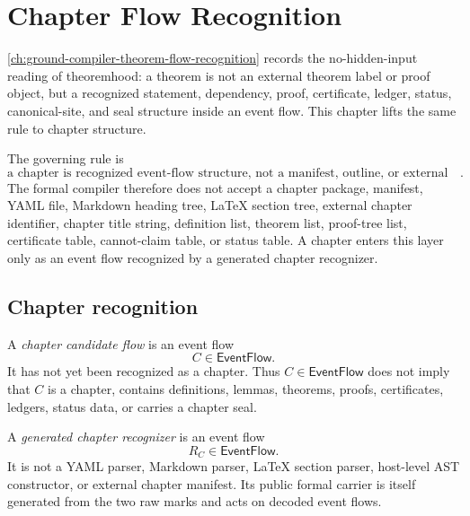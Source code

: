\chapter{Chapter Flow Recognition}
\label{ch:ground-compiler-chapter-flow-recognition}

\autoref{ch:ground-compiler-theorem-flow-recognition} records the no-hidden-input reading of theoremhood: a theorem is not an external theorem label or proof object, but a recognized statement, dependency, proof, certificate, ledger, status, canonical-site, and seal structure inside an event flow. This chapter lifts the same rule to chapter structure.

The governing rule is
$$
  \boxed{\text{a chapter is recognized event-flow structure, not a manifest, outline, or external package}.}
$$
The formal compiler therefore does not accept a chapter package, manifest, YAML file, Markdown heading tree, \LaTeX{} section tree, external chapter identifier, chapter title string, definition list, theorem list, proof-tree list, certificate table, cannot-claim table, or status table. A chapter enters this layer only as an event flow recognized by a generated chapter recognizer.

\section{Chapter recognition}
\label{sec:chapter-generated-recognition}

\begin{definition}
\label{def:chapter-generated-candidate-flow}
A \emph{chapter candidate flow} is an event flow
$$
  C \in \mathsf{EventFlow}.
$$
It has not yet been recognized as a chapter. Thus $C\in\mathsf{EventFlow}$ does not imply that $C$ is a chapter, contains definitions, lemmas, theorems, proofs, certificates, ledgers, status data, or carries a chapter seal.
\end{definition}

\begin{definition}
\label{def:chapter-generated-recognizer}
A \emph{generated chapter recognizer} is an event flow
$$
  R_C\in\mathsf{EventFlow}.
$$
It is not a YAML parser, Markdown parser, \LaTeX{} section parser, host-level AST constructor, or external chapter manifest. Its public formal carrier is itself generated from the two raw marks and acts on decoded event flows.
\end{definition}


